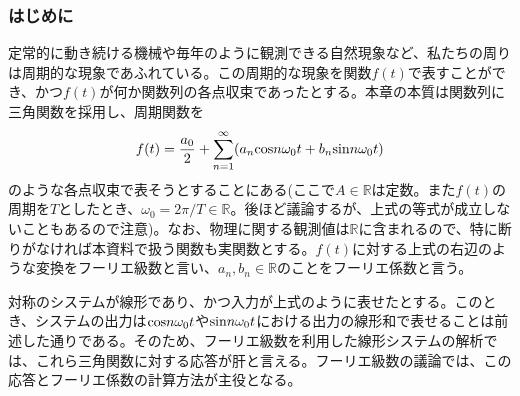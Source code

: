 \documentclass[dvipdfmx, 9pt, a4paper]{jsarticle}
\begin{document}
\subsubsection{はじめに}
定常的に動き続ける機械や毎年のように観測できる自然現象など、私たちの周りは周期的な現象であふれている。この周期的な現象を関数$f(t)$で表すことができ、かつ$f(t)$が何か関数列の各点収束であったとする。本章の本質は関数列に三角関数を採用し、周期関数を
\begin{equation}
f(t)=\frac{a_0}{2}+\sum_{n=1}^\infty (a_n{\rm cos}n\omega_0t+b_n{\rm sin}n\omega_0t)
\end{equation}
のような各点収束で表そうとすることにある(ここで$A \in \mathbb{R}$は定数。また$f(t)$の周期を$T$としたとき、$\omega_0=2\pi/T \in \mathbb{R}$。後ほど議論するが、上式の等式が成立しないこともあるので注意)。なお、物理に関する観測値は$\mathbb{R}$に含まれるので、特に断りがなければ本資料で扱う関数も実関数とする。$f(t)$に対する上式の右辺のような変換をフーリエ級数と言い、$a_n, b_n \in \mathbb{R}$のことをフーリエ係数と言う。\par
対称のシステムが線形であり、かつ入力が上式のように表せたとする。このとき、システムの出力は${\rm cos}n\omega_0t$や${\rm sin}n\omega_0t$における出力の線形和で表せることは前述した通りである。そのため、フーリエ級数を利用した線形システムの解析では、これら三角関数に対する応答が肝と言える。フーリエ級数の議論では、この応答とフーリエ係数の計算方法が主役となる。
\end{document}
